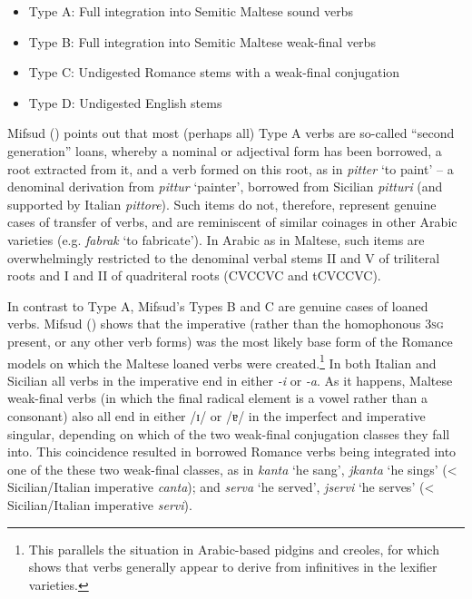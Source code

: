 \documentclass[output=paper]{langsci/langscibook}
\begin{document}
\begin{itemize}[noitemsep]
	\item[] Type A: Full integration into Semitic Maltese sound verbs 
    \item[] Type B: Full integration into Semitic Maltese weak-final verbs
    \item[] Type C: Undigested Romance stems with a weak-final conjugation
    \item[] Type D: Undigested English stems
\end{itemize}

Mifsud (\citeyear[58]{mifsudloanverbs}) points out that most (perhaps all) Type A verbs are so-called ``second generation'' loans, whereby a nominal or adjectival form has been borrowed, a root extracted from it, and a verb formed on this root, as in \textit{pitter} `to paint' -- a denominal derivation from \textit{pittur} `painter', borrowed from Sicilian \textit{pitturi} (and supported by Italian \textit{pittore}). Such items do not, therefore, represent genuine cases of transfer of verbs, and are reminiscent of similar coinages in other Arabic varieties (e.g. \textit{fabrak} `to fabricate'). In Arabic as in Maltese, such items are overwhelmingly restricted to the denominal verbal stems II and V of triliteral roots and I and II of quadriteral roots (CVCCVC and tCVCCVC). 

In contrast to Type A, Mifsud's Types B and C are genuine cases of loaned verbs. Mifsud (\citeyear[110--116]{mifsudloanverbs}) shows that the imperative (rather than the homophonous 3\textsc{sg} present, or any other verb forms) was the most likely base form of the Romance models on which the Maltese loaned verbs were created.\footnote{This parallels the situation in Arabic-based pidgins and creoles, for which \cite{Versteegh2014pidgin} shows that verbs generally appear to derive from infinitives in the lexifier varieties.} In both Italian and Sicilian all verbs in the imperative end in either \textit{-i} or \textit{-a}. As it happens, Maltese weak-final verbs (in which the final radical element is a vowel rather than a consonant) also all end in either /ɪ/ or /ɐ/ in the imperfect and imperative singular, depending on which of the two weak-final conjugation classes they fall into. This coincidence resulted in borrowed Romance verbs being integrated into one of the these two weak-final classes, as in \textit{kanta} `he sang', \textit{jkanta} `he sings' (< Sicilian/Italian imperative \textit{canta}); and \textit{serva} `he served', \textit{jservi} `he serves' (< Sicilian/Italian imperative \textit{servi}).
\end{document}
